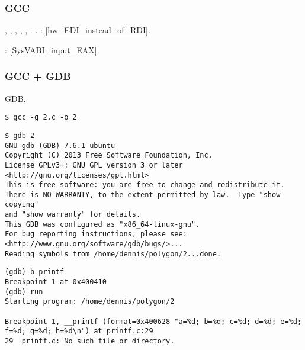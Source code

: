 \subsubsection{GCC}

 \RDI, \RSI,
\RDX, \RCX, , .
.
: \ref{hw_EDI_instead_of_RDI}.

: \ref{SysVABI_input_EAX}.



\ifdefined\IncludeGDB
\subsubsection{GCC + GDB}

 \ac{GDB}.

\begin{lstlisting}
$ gcc -g 2.c -o 2
\end{lstlisting}

\begin{lstlisting}
$ gdb 2
GNU gdb (GDB) 7.6.1-ubuntu
Copyright (C) 2013 Free Software Foundation, Inc.
License GPLv3+: GNU GPL version 3 or later <http://gnu.org/licenses/gpl.html>
This is free software: you are free to change and redistribute it.
There is NO WARRANTY, to the extent permitted by law.  Type "show copying"
and "show warranty" for details.
This GDB was configured as "x86_64-linux-gnu".
For bug reporting instructions, please see:
<http://www.gnu.org/software/gdb/bugs/>...
Reading symbols from /home/dennis/polygon/2...done.
\end{lstlisting}

\begin{lstlisting}[caption=\RU{ставим брякпойнт на \printf{,} запускаем}\EN{let's set the breakpoint to \printf{,} and run}]
(gdb) b printf
Breakpoint 1 at 0x400410
(gdb) run
Starting program: /home/dennis/polygon/2 

Breakpoint 1, __printf (format=0x400628 "a=%d; b=%d; c=%d; d=%d; e=%d; f=%d; g=%d; h=%d\n") at printf.c:29
29	printf.c: No such file or directory.
\end{lstlisting}

